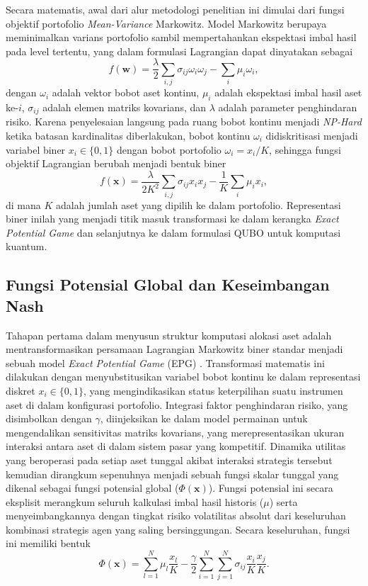 Secara matematis, awal dari alur metodologi penelitian ini dimulai dari fungsi objektif portofolio \textit{Mean-Variance} Markowitz. Model Markowitz berupaya meminimalkan varians portofolio sambil mempertahankan ekspektasi imbal hasil pada level tertentu, yang dalam formulasi Lagrangian dapat dinyatakan sebagai
\begin{equation}
    f(\mathbf{w}) = \frac{\lambda}{2} \sum_{i,j} \sigma_{ij} \omega_i \omega_j - \sum_i \mu_i \omega_i,
\end{equation}
dengan $\omega_i$ adalah vektor bobot aset kontinu, $\mu_i$ adalah ekspektasi imbal hasil aset ke-$i$, $\sigma_{ij}$ adalah elemen matriks kovarians, dan $\lambda$ adalah parameter penghindaran risiko. Karena penyelesaian langsung pada ruang bobot kontinu menjadi \textit{NP-Hard} ketika batasan kardinalitas diberlakukan, bobot kontinu $\omega_i$ didiskritisasi menjadi variabel biner $x_i \in \{0, 1\}$ dengan bobot portofolio $\omega_i = x_i/K$, sehingga fungsi objektif Lagrangian berubah menjadi bentuk biner
\begin{equation}
    f(\mathbf{x}) = \frac{\lambda}{2K^2} \sum_{i,j} \sigma_{ij} x_i x_j - \frac{1}{K}\sum_i \mu_i x_i,
    \label{eq:lagrangian_markowitz_binary}
\end{equation}
di mana $K$ adalah jumlah aset yang dipilih ke dalam portofolio. Representasi biner inilah yang menjadi titik masuk transformasi ke dalam kerangka \textit{Exact Potential Game} dan selanjutnya ke dalam formulasi QUBO untuk komputasi kuantum.

\subsection{Fungsi Potensial Global dan Keseimbangan Nash}

Tahapan pertama dalam menyusun struktur komputasi alokasi aset adalah mentransformasikan persamaan Lagrangian Markowitz biner standar menjadi sebuah model \textit{Exact Potential Game} (EPG) \cite{monderer_potential_1996}. Transformasi matematis ini dilakukan dengan menyubstitusikan variabel bobot kontinu ke dalam representasi diskret $x_i \in \{0, 1\}$, yang mengindikasikan status keterpilihan suatu instrumen aset di dalam konfigurasi portofolio. Integrasi faktor penghindaran risiko, yang disimbolkan dengan $\gamma$, diinjeksikan ke dalam model permainan untuk mengendalikan sensitivitas matriks kovarians, yang merepresentasikan ukuran interaksi antara aset di dalam sistem pasar yang kompetitif. Dinamika utilitas yang beroperasi pada setiap aset tunggal akibat interaksi strategis tersebut kemudian dirangkum sepenuhnya menjadi sebuah fungsi skalar tunggal yang dikenal sebagai fungsi potensial global ($\Phi(\mathbf{x})$). Fungsi potensial ini secara eksplisit merangkum seluruh kalkulasi imbal hasil historis ($\mu$) serta menyeimbangkannya dengan tingkat risiko volatilitas absolut dari keseluruhan kombinasi strategis agen yang saling bersinggungan. Secara keseluruhan, fungsi ini memiliki bentuk
\begin{equation}
\label{eq:global_potential_function}
\Phi(\mathbf{x}) = \sum_{l=1}^N \mu_l \frac{x_l}{K} - \frac{\gamma}{2}\sum_{i=1}^N\sum_{j=1}^N \sigma_{ij} \frac{x_i}{K} \frac{x_j}{K}.
\end{equation}

